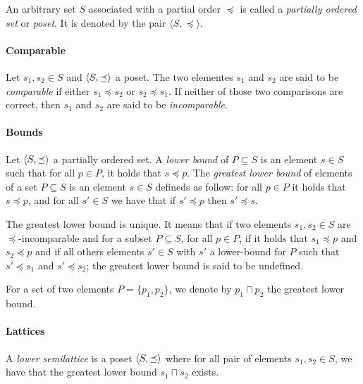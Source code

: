 \documentclass[letterpaper]{article}
\DeclarePairedDelimiter{\tuple}{\langle}{\rangle}
\theoremstyle{definition}
\begin{document}
An arbitrary set $S$ associated with a partial order $\preceq$
is called a \textit{partially ordered set} or \textit{poset}.
It is denoted by the pair $\langle S, \preceq \rangle$.

\paragraph{Comparable}

Let $s_1, s_2 \in S$ and $\tuple{S, \preceq}$ a poset.
The two elementes $s_1$ and $s_2$ are said to be \textit{comparable} if either
$s_1 \preceq s_2$ or $s_2 \preceq s_1$. If neither of those two comparisons
are correct, then $s_1$ and $s_2$ are said to be \textit{incomparable}.


\paragraph{Bounds} Let $\tuple{S, \preceq}$ a partially ordered set.
A \textit{lower bound} of $P \subseteq S$ is an element $s \in S$
such that for all $p \in P$, it holds that $s \preceq p$.
The \textit{greatest lower bound} of elements of a set $P \subseteq S$
is an element $s \in S$ defineds as follow:
for all $p \in P$
it holds that $s \preceq p$, and for all $s' \in S$ we have that
if $s' \preceq p$ then $s' \preceq s$.

The greatest lower bound is unique. It means that if two elements
$s_1, s_2 \in S$ are $\preceq$-incomparable and for a subset $P \subseteq S$,
for all $p \in P$, if it holds that $s_1 \preceq p$ and $s_2 \preceq p$
and if all others elements $s' \in S$ with $s'$ a lower-bound
for $P$ such that $s' \preceq s_1$ and $s' \preceq s_2$;
the greatest lower bound is said to be undefined.

For a set of two elements
$P = \{p_1, p_2\}$, we denote by $p_1 \sqcap p_2$ the greatest lower bound.

\paragraph{Lattices} A \textit{lower semilattice} is a poset
$\tuple{S, \preceq}$ where for all pair of elements $s_1, s_2 \in S$,
we have that the greatest lower bound $s_1 \sqcap s_2$ exists.


\end{document}
